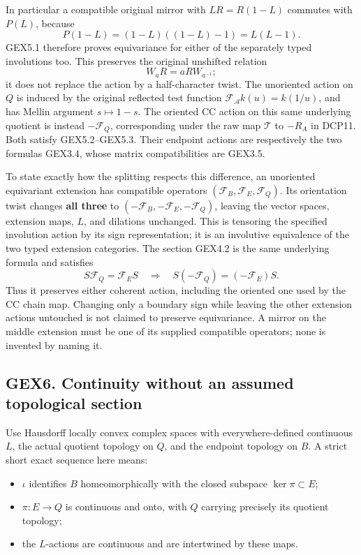 In particular a compatible original mirror with \(LR=R(1-L)\) commutes
with \(P(L)\), because \[
P(1-L)=(1-L)((1-L)-1)=L(L-1).
\tag{GEX5.2}
\] GEX5.1 therefore proves equivariance for either of the separately
typed involutions too. This preserves the original unshifted relation \[
W_aR=aRW_{a^{-1}};
\tag{GEX5.3}
\] it does not replace the action by a half-character twist. The
unoriented action on \(Q\) is induced by the original reflected test
function \(\mathcal F_{\mathcal A}k(u)=k(1/u)\), and has Mellin argument
\(s\mapsto1-s\). The oriented CC action on this same underlying quotient
is instead \(-\mathcal F_Q\), corresponding under the raw map
\(\mathcal T\) to \(-R_A\) in DCP11. Both satisfy GEX5.2--GEX5.3. Their
endpoint actions are respectively the two formulas GEX3.4, whose matrix
compatibilities are GEX3.5.

To state exactly how the splitting respects this difference, an
unoriented equivariant extension has compatible operators
\((\mathcal F_B,\mathcal F_E,\mathcal F_Q)\). Its orientation twist
changes \textbf{all three} to
\((-\mathcal F_B,-\mathcal F_E,-\mathcal F_Q)\), leaving the vector
spaces, extension maps, \(L\), and dilations unchanged. This is
tensoring the specified involution action by its sign representation; it
is an involutive equivalence of the two typed extension categories. The
section GEX4.2 is the same underlying formula and satisfies \[
 S\mathcal F_Q=\mathcal F_ES
 \quad\Longrightarrow\quad
 S(-\mathcal F_Q)=(-\mathcal F_E)S.
\tag{GEX5.4}
\] Thus it preserves either coherent action, including the oriented one
used by the CC chain map. Changing only a boundary sign while leaving
the other extension actions untouched is not claimed to preserve
equivariance. A mirror on the middle extension must be one of its
supplied compatible operators; none is invented by naming it.

\subsection{GEX6. Continuity without an assumed topological
section}\label{gex6.-continuity-without-an-assumed-topological-section}

Use Hausdorff locally convex complex spaces with everywhere-defined
continuous \(L\), the actual quotient topology on \(Q\), and the
endpoint topology on \(B\). A strict short exact sequence here means:

\begin{itemize}
\tightlist
\item
  \(\iota\) identifies \(B\) homeomorphically with the closed subspace
  \(\ker\pi\subset E\);
\item
  \(\pi:E\to Q\) is continuous and onto, with \(Q\) carrying precisely
  its quotient topology;
\item
  the \(L\)-actions are continuous and are intertwined by these maps.
\end{itemize}

